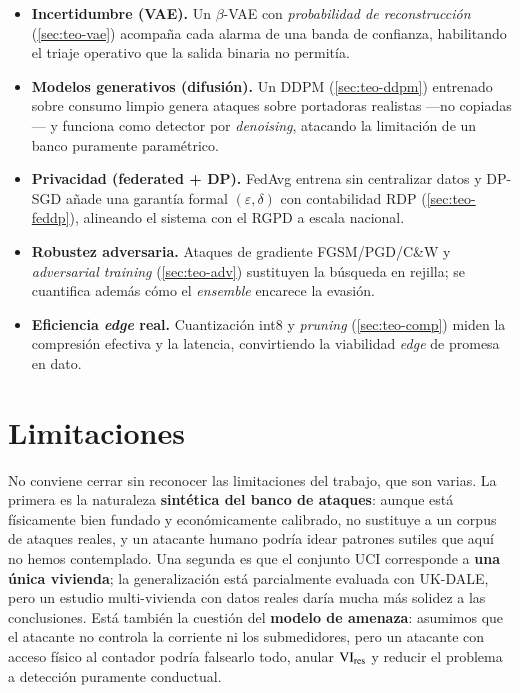 \begin{itemize}[leftmargin=*,topsep=2pt]
  \item \textbf{Incertidumbre (VAE).} Un $\beta$-VAE con \emph{probabilidad de reconstrucción} (\cref{sec:teo-vae}) acompaña cada alarma de una banda de confianza, habilitando el triaje operativo que la salida binaria no permitía.
  \item \textbf{Modelos generativos (difusión).} Un DDPM (\cref{sec:teo-ddpm}) entrenado sobre consumo limpio genera ataques sobre portadoras realistas ---no copiadas--- y funciona como detector por \emph{denoising}, atacando la limitación de un banco puramente paramétrico.
  \item \textbf{Privacidad (federated + DP).} FedAvg entrena sin centralizar datos y DP-SGD añade una garantía formal $(\varepsilon,\delta)$ con contabilidad RDP (\cref{sec:teo-feddp}), alineando el sistema con el RGPD a escala nacional.
  \item \textbf{Robustez adversaria.} Ataques de gradiente FGSM/PGD/C\&W y \emph{adversarial training} (\cref{sec:teo-adv}) sustituyen la búsqueda en rejilla; se cuantifica además cómo el \emph{ensemble} encarece la evasión.
  \item \textbf{Eficiencia \textit{edge} real.} Cuantización int8 y \emph{pruning} (\cref{sec:teo-comp}) miden la compresión efectiva y la latencia, convirtiendo la viabilidad \textit{edge} de promesa en dato.
\end{itemize}

\section{Limitaciones}
\label{sec:limitaciones}

No conviene cerrar sin reconocer las limitaciones del trabajo, que son varias. La primera es la naturaleza \textbf{sintética del banco de ataques}: aunque está físicamente bien fundado y económicamente calibrado, no sustituye a un corpus de ataques reales, y un atacante humano podría idear patrones sutiles que aquí no hemos contemplado. Una segunda es que el conjunto UCI corresponde a \textbf{una única vivienda}; la generalización está parcialmente evaluada con UK-DALE, pero un estudio multi-vivienda con datos reales daría mucha más solidez a las conclusiones. Está también la cuestión del \textbf{modelo de amenaza}: asumimos que el atacante no controla la corriente ni los submedidores, pero un atacante con acceso físico al contador podría falsearlo todo, anular $\mathrm{VI}_{\text{res}}$ y reducir el problema a detección puramente conductual.

